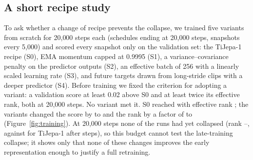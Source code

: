 \subsection{A short recipe study}
\label{sec:recipe}
To ask whether a change of recipe prevents the collapse, we trained five variants from
scratch for 20{,}000 steps each (schedules ending at 20{,}000 steps, snapshots every 5{,}000)
and scored every snapshot only on the validation set: the TiJepa-1 recipe (S0), EMA
momentum capped at 0.9995 (S1), a variance--covariance penalty on the predictor outputs
\citep{vicreg} (S2), an effective batch of 256 with a linearly scaled learning rate (S3),
and future targets drawn from long-stride clips with a deeper predictor (S4). Before
training we fixed the criterion for adopting a variant: a validation score at least 0.02
above S0 and at least twice its effective rank, both at 20{,}000 steps. No variant met it.
S0 reached  with effective rank ; the variants changed the
score by  to  and the rank by a factor of  to
 (Figure~\ref{fig:training}). At 20{,}000 steps none of the runs had yet
collapsed (rank --, against 
for TiJepa-1 after  steps), so this budget cannot test the late-training
collapse; it shows only that none of these changes improves the early representation enough
to justify a full retraining.

